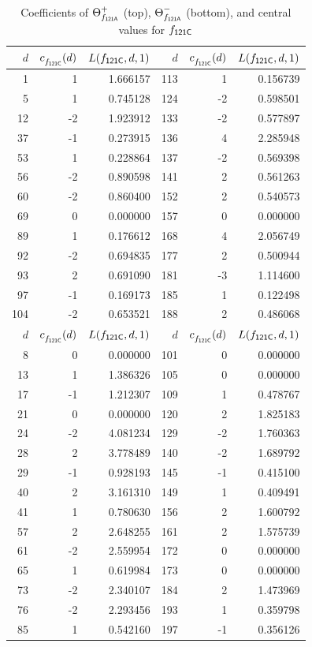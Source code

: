 \begin{table}
\begin{tabular}{||r|rr||r|rr||}
\hline
$d$ & $c^{}_{f_\mathsf{{121C}}}(d)$ & $L(f_\mathsf{{121C}},d,1)$& $d$ & $c^{}_{f_\mathsf{{121C}}}(d)$ & $L(f_\mathsf{{121C}},d,1)$\\
\hline
   1 & 1 & 1.666157 & 113 & 1 & 0.156739 \\
   5 & 1 & 0.745128 & 124 & -2 & 0.598501 \\
   12 & -2 & 1.923912 & 133 & -2 & 0.577897 \\
   37 & -1 & 0.273915 & 136 & 4 & 2.285948 \\
   53 & 1 & 0.228864 & 137 & -2 & 0.569398 \\
   56 & -2 & 0.890598 & 141 & 2 & 0.561263 \\
   60 & -2 & 0.860400 & 152 & 2 & 0.540573 \\
   69 & 0 & 0.000000 & 157 & 0 & 0.000000 \\
   89 & 1 & 0.176612 & 168 & 4 & 2.056749 \\
   92 & -2 & 0.694835 & 177 & 2 & 0.500944 \\
   93 & 2 & 0.691090 & 181 & -3 & 1.114600 \\
   97 & -1 & 0.169173 & 185 & 1 & 0.122498 \\
   104 & -2 & 0.653521 & 188 & 2 & 0.486068 \\
\hline
$d$ & $c^{}_{f_\mathsf{{121C}}}(d)$ & $L(f_\mathsf{{121C}},d,1)$& $d$ & $c^{}_{f_\mathsf{{121C}}}(d)$ & $L(f_\mathsf{{121C}},d,1)$\\
\hline
   8 & 0 & 0.000000 & 101 & 0 & 0.000000 \\
   13 & 1 & 1.386326 & 105 & 0 & 0.000000 \\
   17 & -1 & 1.212307 & 109 & 1 & 0.478767 \\
   21 & 0 & 0.000000 & 120 & 2 & 1.825183 \\
   24 & -2 & 4.081234 & 129 & -2 & 1.760363 \\
   28 & 2 & 3.778489 & 140 & -2 & 1.689792 \\
   29 & -1 & 0.928193 & 145 & -1 & 0.415100 \\
   40 & 2 & 3.161310 & 149 & 1 & 0.409491 \\
   41 & 1 & 0.780630 & 156 & 2 & 1.600792 \\
   57 & 2 & 2.648255 & 161 & 2 & 1.575739 \\
   61 & -2 & 2.559954 & 172 & 0 & 0.000000 \\
   65 & 1 & 0.619984 & 173 & 0 & 0.000000 \\
   73 & -2 & 2.340107 & 184 & 2 & 1.473969 \\
   76 & -2 & 2.293456 & 193 & 1 & 0.359798 \\
   85 & 1 & 0.542160 & 197 & -1 & 0.356126 \\
\hline
\end{tabular}
\caption{Coefficients of
${\Theta}^+_{f_\mathsf{{121A}}}$ (top),
${\Theta}^-_{f_\mathsf{{121A}}}$ (bottom), and central values for $f_\mathsf{{121C}}$
          \label{table:dlcs:121A}}
\end{table}
